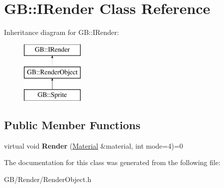 \hypertarget{class_g_b_1_1_i_render}{}\section{GB\+::I\+Render Class Reference}
\label{class_g_b_1_1_i_render}
Inheritance diagram for GB\+::I\+Render\+:\begin{figure}[H]
\begin{center}
\leavevmode
\includegraphics[height=3.000000cm]{class_g_b_1_1_i_render}
\end{center}
\end{figure}
\subsection*{Public Member Functions}
\begin{DoxyCompactItemize}
\item 
\mbox{\label{class_g_b_1_1_i_render_a6c815d30492d98c4a704283723f9327a}} 
virtual void {\bfseries Render} (\mbox{\hyperlink{class_g_b_1_1_material}{Material}} \&material, int mode=4)=0
\end{DoxyCompactItemize}


The documentation for this class was generated from the following file\+:\begin{DoxyCompactItemize}
\item 
G\+B/\+Render/Render\+Object.\+h\end{DoxyCompactItemize}
